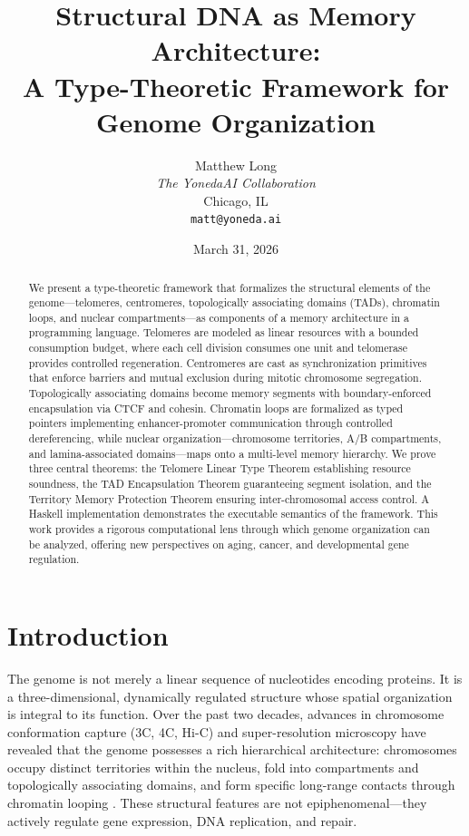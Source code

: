 \documentclass[12pt,a4paper]{article}
\title{\textbf{Structural DNA as Memory Architecture:\\A Type-Theoretic Framework for Genome Organization}}
\author{
  Matthew Long\\
  \textit{The YonedaAI Collaboration}\\
  Chicago, IL\\
  \texttt{matt@yoneda.ai}
}
\date{March 31, 2026}
\theoremstyle{plain}
\theoremstyle{definition}
\begin{document}
\maketitle

\begin{abstract}
We present a type-theoretic framework that formalizes the structural elements of the genome---telomeres, centromeres, topologically associating domains (TADs), chromatin loops, and nuclear compartments---as components of a memory architecture in a programming language. Telomeres are modeled as linear resources with a bounded consumption budget, where each cell division consumes one unit and telomerase provides controlled regeneration. Centromeres are cast as synchronization primitives that enforce barriers and mutual exclusion during mitotic chromosome segregation. Topologically associating domains become memory segments with boundary-enforced encapsulation via CTCF and cohesin. Chromatin loops are formalized as typed pointers implementing enhancer-promoter communication through controlled dereferencing, while nuclear organization---chromosome territories, A/B compartments, and lamina-associated domains---maps onto a multi-level memory hierarchy. We prove three central theorems: the Telomere Linear Type Theorem establishing resource soundness, the TAD Encapsulation Theorem guaranteeing segment isolation, and the Territory Memory Protection Theorem ensuring inter-chromosomal access control. A Haskell implementation demonstrates the executable semantics of the framework. This work provides a rigorous computational lens through which genome organization can be analyzed, offering new perspectives on aging, cancer, and developmental gene regulation.
\end{abstract}

\tableofcontents
\newpage

\section{Introduction}\label{sec:intro}

The genome is not merely a linear sequence of nucleotides encoding proteins. It is a three-dimensional, dynamically regulated structure whose spatial organization is integral to its function. Over the past two decades, advances in chromosome conformation capture (3C, 4C, Hi-C) and super-resolution microscopy have revealed that the genome possesses a rich hierarchical architecture: chromosomes occupy distinct territories within the nucleus, fold into compartments and topologically associating domains, and form specific long-range contacts through chromatin looping \cite{lieberman2009comprehensive, dixon2012topological, rao20143d}. These structural features are not epiphenomenal---they actively regulate gene expression, DNA replication, and repair.
\end{document}
